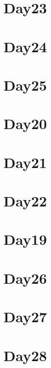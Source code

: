 
\section*{Day23}

\vfill
\section*{Day24}

\vfill
\section*{Day25}

\vfill
\section*{Day20}

\vfill
\section*{Day21}

\vfill
\section*{Day22}

\vfill
\section*{Day19}

\vfill
\section*{Day26}

\vfill
\section*{Day27}

\vfill
\section*{Day28}

\vfill
